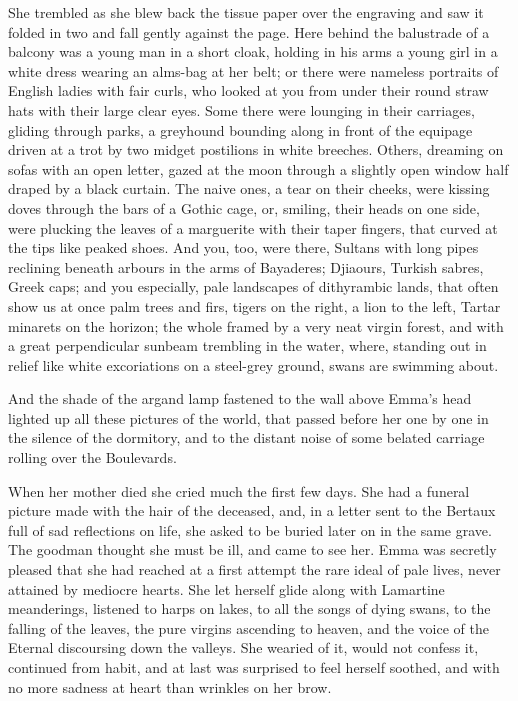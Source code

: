 \documentclass{tufte-book}
\begin{document}
She trembled as she blew back the tissue paper over the engraving and
saw it folded in two and fall gently against the page. Here behind the
balustrade of a balcony was a young man in a short cloak, holding in his
arms a young girl in a white dress wearing an alms-bag at her belt; or
there were nameless portraits of English ladies with fair curls, who
looked at you from under their round straw hats with their large clear
eyes. Some there were lounging in their carriages, gliding through
parks, a greyhound bounding along in front of the equipage driven at
a trot by two midget postilions in white breeches. Others, dreaming on
sofas with an open letter, gazed at the moon through a slightly open
window half draped by a black curtain. The naive ones, a tear on their
cheeks, were kissing doves through the bars of a Gothic cage, or,
smiling, their heads on one side, were plucking the leaves of a
marguerite with their taper fingers, that curved at the tips like peaked
shoes. And you, too, were there, Sultans with long pipes reclining
beneath arbours in the arms of Bayaderes; Djiaours, Turkish sabres,
Greek caps; and you especially, pale landscapes of dithyrambic lands,
that often show us at once palm trees and firs, tigers on the right, a
lion to the left, Tartar minarets on the horizon; the whole framed by
a very neat virgin forest, and with a great perpendicular sunbeam
trembling in the water, where, standing out in relief like white
excoriations on a steel-grey ground, swans are swimming about.

And the shade of the argand lamp fastened to the wall above Emma's head
lighted up all these pictures of the world, that passed before her one
by one in the silence of the dormitory, and to the distant noise of some
belated carriage rolling over the Boulevards.

When her mother died she cried much the first few days. She had a
funeral picture made with the hair of the deceased, and, in a letter
sent to the Bertaux full of sad reflections on life, she asked to be
buried later on in the same grave. The goodman thought she must be ill,
and came to see her. Emma was secretly pleased that she had reached at
a first attempt the rare ideal of pale lives, never attained by mediocre
hearts. She let herself glide along with Lamartine meanderings, listened
to harps on lakes, to all the songs of dying swans, to the falling of
the leaves, the pure virgins ascending to heaven, and the voice of
the Eternal discoursing down the valleys. She wearied of it, would not
confess it, continued from habit, and at last was surprised to feel
herself soothed, and with no more sadness at heart than wrinkles on her
brow.
\end{document}
